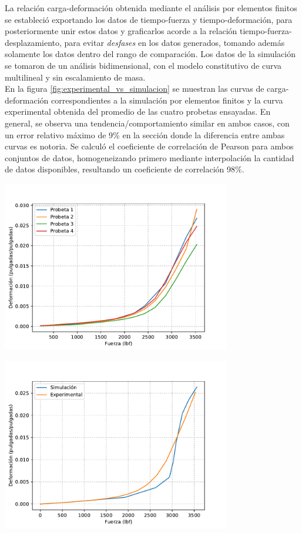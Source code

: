La relación carga-deformación obtenida mediante el análisis por elementos finitos se estableció 
exportando los datos de tiempo-fuerza y tiempo-deformación, para posteriormente unir estos datos 
y graficarlos acorde a la relación tiempo-fuerza-desplazamiento, para evitar \textit{desfases} en 
los datos generados, tomando además solamente los datos dentro del rango de comparación. 
Los datos de la simulación se tomaron de un análisis bidimensional, con el modelo constitutivo 
de curva multilineal y sin escalamiento de masa.\\

En la figura \ref{fig:experimental_vs_simulacion} se muestran las curvas de carga-deformación 
correspondientes a la simulación por elementos finitos y la curva experimental obtenida del 
promedio de las cuatro probetas ensayadas. En general, se observa una tendencia/comportamiento 
similar en ambos casos, con un error relativo máximo de 9\% en la sección donde la diferencia 
entre ambas curvas es notoria. Se calculó el coeficiente de correlación de Pearson para ambos conjuntos de datos, 
homogeneizando primero mediante interpolación la cantidad de datos disponibles, resultando 
un coeficiente de correlación 98\%.

\begin{center}
\includegraphics[width=0.75\textwidth]{src/ch4/experimental_probetas.pdf}
\label{fig:experimental_probetas}
\end{center}

\begin{center}
\includegraphics[width=0.75\textwidth]{src/ch4/experimental_vs_simulacion.pdf}
\label{fig:experimental_vs_simulacion}
\end{center}